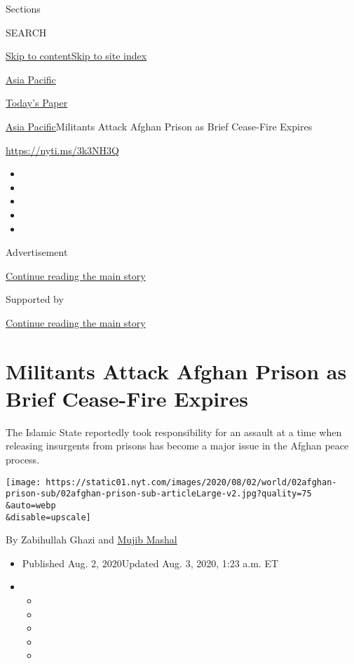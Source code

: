 Sections

SEARCH

\protect\hyperlink{site-content}{Skip to
content}\protect\hyperlink{site-index}{Skip to site index}

\href{https://www.nytimes.com/section/world/asia}{Asia Pacific}

\href{https://myaccount.nytimes.com/auth/login?response_type=cookie\&client_id=vi}{}

\href{https://www.nytimes.com/section/todayspaper}{Today's Paper}

\href{/section/world/asia}{Asia Pacific}\textbar{}Militants Attack
Afghan Prison as Brief Cease-Fire Expires

\url{https://nyti.ms/3k3NH3Q}

\begin{itemize}
\item
\item
\item
\item
\item
\end{itemize}

Advertisement

\protect\hyperlink{after-top}{Continue reading the main story}

Supported by

\protect\hyperlink{after-sponsor}{Continue reading the main story}

\hypertarget{militants-attack-afghan-prison-as-brief-cease-fire-expires}{%
\section{Militants Attack Afghan Prison as Brief Cease-Fire
Expires}\label{militants-attack-afghan-prison-as-brief-cease-fire-expires}}

The Islamic State reportedly took responsibility for an assault at a
time when releasing insurgents from prisons has become a major issue in
the Afghan peace process.

\texttt{[image: https://static01.nyt.com/images/2020/08/02/world/02afghan-prison-sub/02afghan-prison-sub-articleLarge-v2.jpg?quality=75\\\&auto=webp\\\&disable=upscale]}

By Zabihullah Ghazi and
\href{https://www.nytimes.com/by/mujib-mashal}{Mujib Mashal}

\begin{itemize}
\item
  Published Aug. 2, 2020Updated Aug. 3, 2020, 1:23 a.m. ET
\item
  \begin{itemize}
  \item
  \item
  \item
  \item
  \item
  \end{itemize}
\end{itemize}


